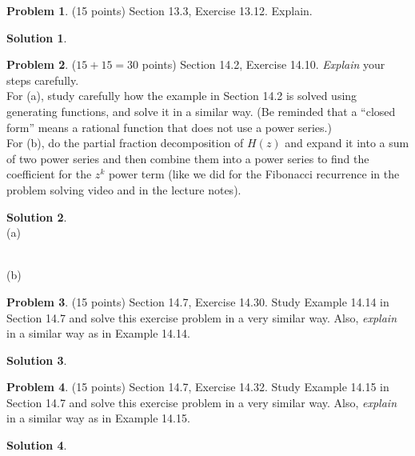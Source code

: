 \documentclass{article}
\theoremstyle{definition}
\newtheorem{problem}{Problem}
\newtheorem*{solution}{Solution}
\begin{document}
\newpage
\begin{problem} (15 points) Section 13.3, Exercise 13.12. Explain.
\end{problem}
\begin{solution}
\end{solution}

\newpage
\begin{problem} ($15+15=30$ points) Section 14.2, Exercise 14.10.
\textit{Explain} your steps carefully.\\[.5ex]
For (a), study carefully how the example in Section 14.2 is solved using generating 
functions, and solve it in a similar way. (Be reminded that a ``closed form'' means a 
rational function that does not use a power series.)\\[.5ex]
For (b), do the partial fraction decomposition of $H(z)$ and expand it into a sum of 
two power series and then combine them into a power series to find the coefficient 
for the $z^k$ power term (like we did for the Fibonacci recurrence in the problem 
solving video and in the lecture notes). 
\end{problem}
\begin{solution}
\ \\
(a)

\ \\
(b)
\end{solution}

\newpage
\begin{problem} (15 points) Section 14.7, Exercise 14.30.  Study Example 14.14
in Section 14.7 and solve this exercise problem in a very similar way.  Also, 
\textit{explain} in a similar way as in Example 14.14.
\end{problem}
\begin{solution}
\end{solution}

\newpage
\begin{problem} (15 points) Section 14.7, Exercise 14.32.  Study Example 14.15
in Section 14.7 and solve this exercise problem in a very similar way.  Also, 
\textit{explain} in a similar way as in Example 14.15.
\end{problem}
\begin{solution}
\end{solution}
\end{document}
